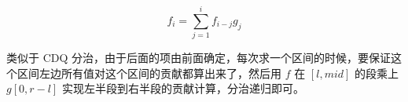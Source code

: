 \[
f_i = \sum_{j=1}^{i} f_{i-j} g_j
\]

类似于 CDQ 分治，由于后面的项由前面确定，每次求一个区间的时候，要保证这个区间左边所有值对这个区间的贡献都算出来了，然后用 $f$ 在 $[l, \textit{mid}]$ 的段乘上 $g[0, r - l]$ 实现左半段到右半段的贡献计算，分治递归即可。
